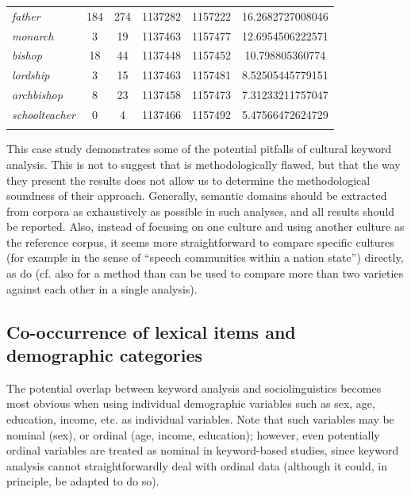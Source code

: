 \begin{table}
{\begin{tabular}[t]{l *{2}{S[table-format=3]} *{2}{S[table-format=7]} S[table-format=2.2]}
\textit{father} & 184 & 274 & 1137282 & 1157222 & 16.2682727008046 \\
\textit{monarch} & 3 & 19 & 1137463 & 1157477 & 12.6954506222571 \\
\textit{bishop} & 18 & 44 & 1137448 & 1157452 & 10.798805360774 \\
\textit{lordship} & 3 & 15 & 1137463 & 1157481 & 8.52505445779151 \\
\textit{archbishop} & 8 & 23 & 1137458 & 1157473 & 7.31233211757047 \\
\textit{schoolteacher} & 0 & 4 & 1137466 & 1157492 & 5.47566472624729 \\
\lspbottomrule
\end{tabular}}
\end{table}

This case study demonstrates some of the potential pitfalls of cultural  keyword  analysis. This is not to suggest that \citet{wolf_fixed_2007} is methodologically flawed, but that the way they present the results does not allow us to determine the methodological soundness of their approach. Generally, semantic  domains should be extracted  from corpora as exhaustively as possible in such analyses, and all results should be reported. Also, instead of focusing on one culture  and using another culture as the reference corpus, it seems more straightforward to compare specific cultures  (for example in the sense of ``speech communities within a nation state'') directly, as \citet{leech_computer_1992} do (cf. also \citealt{oakes_use_2007} for a method than can be used to compare more than two varieties  against each other in a single analysis).

\subsection{Co\hyp{}occurrence of lexical items and demographic categories}
\label{sec:co-occurrenceoflexicalitemsanddemographiccategories}

The potential overlap between keyword  analysis and sociolinguistics  becomes most obvious when using individual demographic  variables such as sex, age,  education, income, etc. as individual variables. Note that such variables may be nominal  (sex), or ordinal (age,  income, education); however, even potentially ordinal  variables are treated as nominal in keyword\hyp{}based  studies, since keyword analysis cannot straightforwardly deal with ordinal data (although it could, in principle, be adapted to do so).

